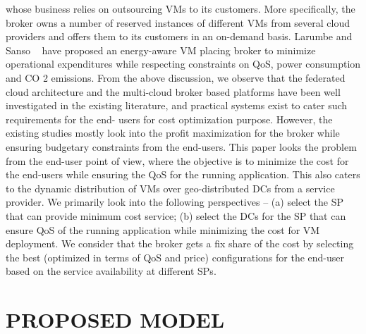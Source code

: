 \documentclass[conference]{IEEEtran}
\newcommand\tab[1][0.8cm]{\hspace*{#1}}
\begin{document}
whose business relies on outsourcing VMs to its customers.
More specifically, the broker owns a number of reserved
instances of different VMs from several cloud providers and
offers them to its customers in an on-demand basis. Larumbe
and Sanso ~\cite{b10} have proposed an energy-aware VM placing
broker to minimize operational expenditures while respecting
constraints on QoS, power consumption and CO 2 emissions.
\newline
\tab From the above discussion, we observe that the federated
cloud architecture and the multi-cloud broker based platforms
have been well investigated in the existing literature, and practical systems exist to cater such requirements for the end-
users for cost optimization purpose. However, the existing
studies mostly look into the profit maximization for the broker
while ensuring budgetary constraints from the end-users. This
paper looks the problem from the end-user point of view,
where the objective is to minimize the cost for the end-users
while ensuring the QoS for the running application. This also
caters to the dynamic distribution of VMs over geo-distributed
DCs from a service provider. We primarily look into the
following perspectives – (a) select the SP that can provide
minimum cost service; (b) select the DCs for the SP that can
ensure QoS of the running application while minimizing the
cost for VM deployment. We consider that the broker gets a
fix share of the cost by selecting the best (optimized in terms
of QoS and price) configurations for the end-user based on the
service availability at different SPs.

\section{PROPOSED MODEL}
\end{document}
